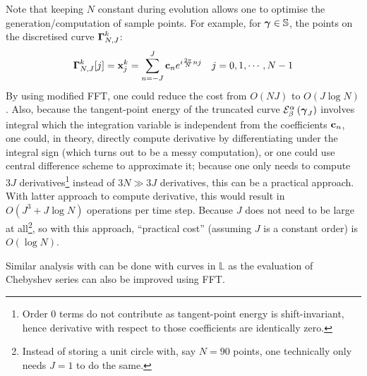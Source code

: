 \documentclass[../dissertation.tex]{subfiles}
\begin{document}
Note that keeping $N$ constant during evolution allows one to optimise the generation/computation of sample points.
For example, for $\boldsymbol{\gamma} \in \mathbb{S}$, the points on the discretised curve $\boldsymbol{\Gamma}_{N,J}^k$:
\begin{align}
    \boldsymbol{\Gamma}_{N,J}^k [j] &= \mathbf{x}_{j}^{k} = \sum_{n=-J}^{J} \mathbf{c}_{n} e^{i \frac{2\pi}{N}n j} & j=0,1,\cdots,N-1
\end{align}
By using modified FFT\cite{5213896}, one could reduce the cost from $O\left( NJ \right)$ to $O \left( J \log N \right)$.
Also, because the tangent-point energy of the truncated curve $\mathcal{E}_{\beta}^{\alpha} \left( \boldsymbol{\gamma}_{J} \right)$ involves integral which the integration variable is independent from the coefficients $\mathbf{c}_n$,
one could, in theory, directly compute derivative by differentiating under the integral sign (which turns out to be a messy computation),
or one could use central difference scheme to approximate it;
because one only needs to compute $3J$ derivatives\footnote{Order $0$ terms do not contribute as tangent-point energy is shift-invariant, hence derivative with respect to those coefficients are identically zero.}
instead of $3N \gg 3J$ derivatives, this can be a practical approach.
With latter approach to compute derivative, this would result in $O\left( J^3 + J \log N \right)$ operations per time step.
Because $J$ does not need to be large at all\footnote{Instead of storing a unit circle with, say $N = 90$ points, one technically only needs $J=1$ to do the same.},
so with this approach, ``practical cost'' (assuming $J$ is a constant order) is $O\left( \log N \right)$.

Similar analysis with can be done with curves in $\mathbb{L}$ as the evaluation of Chebyshev series can also be improved using FFT\cite{Trefethen_2020}.
\end{document}
